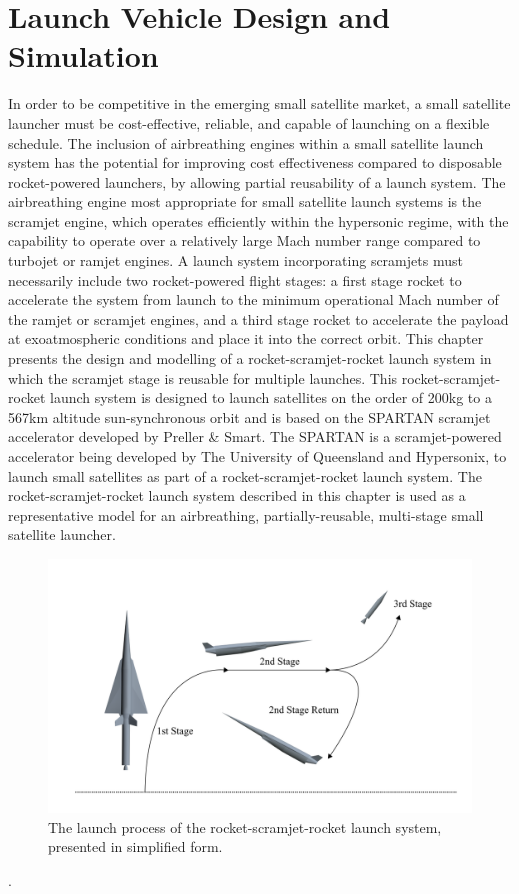 
\cleardoublepage
\chapter{Launch Vehicle Design and Simulation}\label{chapter:Design}

In order to be competitive in the emerging small satellite market, a small satellite launcher must be cost-effective, reliable, and capable of launching on a flexible schedule. The inclusion of airbreathing engines within a small satellite launch system has the potential for improving cost effectiveness compared to disposable rocket-powered launchers, by allowing partial reusability of a launch system. The airbreathing engine most appropriate for small satellite launch systems is the scramjet engine, which operates efficiently within the hypersonic regime, with the capability to operate over a relatively large Mach number range compared to turbojet or ramjet engines. A launch system incorporating scramjets must necessarily include two rocket-powered flight stages: a first stage rocket to accelerate the system from launch to the minimum operational Mach number of the ramjet or scramjet engines, and a third stage rocket to accelerate the payload at exoatmospheric conditions and place it into the correct orbit. 
This chapter presents the design and modelling of a rocket-scramjet-rocket launch system in which the scramjet stage is reusable for multiple launches. 
This rocket-scramjet-rocket launch system is designed to launch satellites on the order of 200kg to a 567km altitude sun-synchronous orbit and is based on the SPARTAN scramjet accelerator developed by Preller \& Smart\cite{Preller2017b}. The SPARTAN is a scramjet-powered accelerator being developed by The University of Queensland and Hypersonix, to launch small satellites as part of a rocket-scramjet-rocket launch system.
The rocket-scramjet-rocket launch system described in this chapter is used as a representative model for an airbreathing, partially-reusable, multi-stage small satellite launcher. 



\begin{figure}[ht]
	\centering
	\includegraphics[width=0.9\linewidth]{figures/3_vehicle_design/Trajsimple}
	\caption{The launch process of the rocket-scramjet-rocket launch system, presented in simplified form.}
	\label{fig:Trajsimple}
\end{figure}
.

